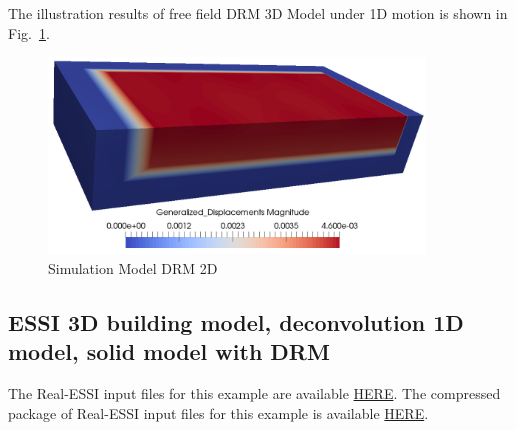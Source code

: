 The illustration results of free field DRM 3D Model under 1D motion is shown 
in Fig.~\ref{fig_day2_DRM3D_results}. 

\begin{figure}[H]
  \centering
  \includegraphics[width = 10cm]{./Figure-files/Day1/Preprocess_examples_with_Gmsh/example4/DRM3D_results.png}
  \caption{Simulation Model DRM 2D}
  \label{fig_day2_DRM3D_results}
\end{figure}



\clearpage
\newpage
\subsection{ESSI 3D building model, deconvolution 1D model, solid model with DRM}
\label{Earthquake_Soil-Structure_Interaction_3D_Model_with_DRM1}

The Real-ESSI input files for this example are available 
\href{http://sokocalo.engr.ucdavis.edu/~jeremic/Real_ESSI_Simulator/Real_ESSI_Short_Course_Examples_Dec2017/short-course-examples/Day2/Deconvolution_1D_Motions/Earthquake_Soil-Structure_Interaction_3D_Model_with_DRM}{HERE}. 
The compressed package of Real-ESSI input files for this example is available 
\href{http://sokocalo.engr.ucdavis.edu/~jeremic/Real_ESSI_Simulator/Real_ESSI_Short_Course_Examples_Dec2017/short-course-examples/Day2/Deconvolution_1D_Motions/Earthquake_Soil-Structure_Interaction_3D_Model_with_DRM/_all_files_packaged_for_Earthquake_Soil-Structure_Interaction_3D_Model_with_DRM.tar.gz}{HERE}. 

